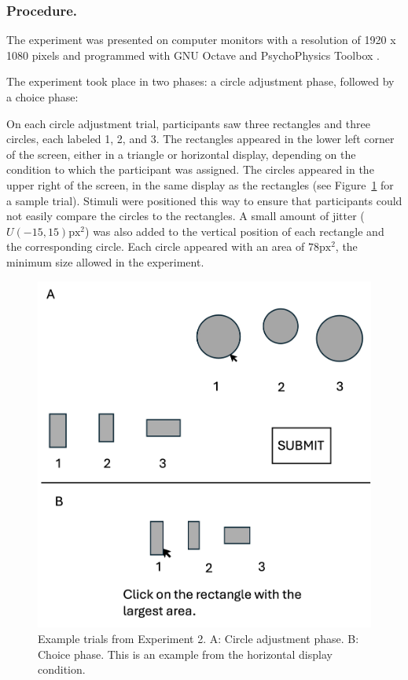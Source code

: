\subsubsection{Procedure.}

The experiment was presented on computer monitors with a resolution of 1920 x 1080 pixels and programmed with GNU Octave \parencite{octave} and PsychoPhysics Toolbox \parencite{brainardPsychophysicsToolbox1997}. 

The experiment took place in two phases: a circle adjustment phase, followed by a choice phase: 

On each circle adjustment trial, participants saw three rectangles and three circles, each labeled 1, 2, and 3. The rectangles appeared in the lower left corner of the screen, either in a triangle or horizontal display, depending on the condition to which the participant was assigned. The circles appeared in the upper right of the screen, in the same display as the rectangles (see Figure~\ref{fig:circle_exp_display} for a sample trial). Stimuli were positioned this way to ensure that participants could not easily compare the circles to the rectangles. A small amount of jitter ($U(-15,15)\text{px}^2$) was also added to the vertical position of each rectangle and the corresponding circle. Each circle appeared with an area of $78 \text{px}^2$, the minimum size allowed in the experiment. 

\begin{figure}
   \includegraphics[width=\linewidth]{figures/circle_exp_display.jpg}
   \caption{Example trials from Experiment 2. A: Circle adjustment phase. B: Choice phase. This is an example from the horizontal display condition.}
   \label{fig:circle_exp_display}
\end{figure}

